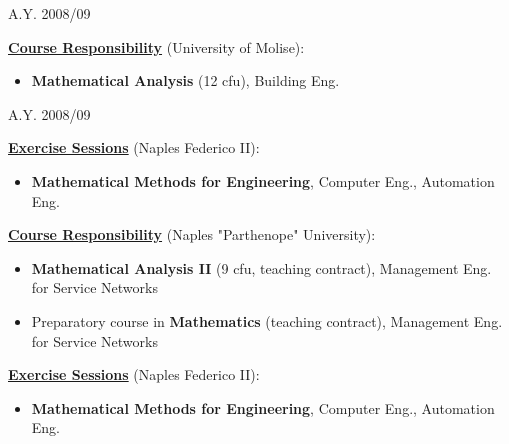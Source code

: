 \documentclass[11pt,a4paper,sans,colorlinks,linkcolor=green]{moderncv}
\begin{document}
  \cvitem
     {A.Y. 2008/09}{\textbf{\underline{Course Responsibility}} (University of Molise):
\begin{itemize} \item \textbf{Mathematical Analysis} (12 cfu),  Building Eng.
  \end{itemize}
     \vspace{-.6cm}\phantom{x}
   }
  \cvitem
     {A.Y. 2008/09}{
     \textbf{\underline{Exercise Sessions}} (Naples Federico II):
\begin{itemize}
   \item \textbf{Mathematical Methods for Engineering},  Computer Eng., Automation Eng.
\end{itemize}
  \vspace{-.6cm}\phantom{x}
}
{
\textbf{\underline{Course Responsibility}} (Naples "Parthenope" University):
  \begin{itemize}  \item \textbf{Mathematical Analysis II} (9 cfu, teaching contract),  Management Eng. for Service Networks
 \item Preparatory course in \textbf{Mathematics} (teaching contract),  Management Eng. for Service Networks
\end{itemize}
  \vspace{-.6cm}\phantom{x}
}
  {   \textbf{\underline{Exercise Sessions}} (Naples Federico II):
\begin{itemize}    \item \textbf{Mathematical Methods for Engineering},  Computer Eng., Automation Eng.%
\end{itemize}
  \vspace{-.6cm}\phantom{x}
}
\end{document}
